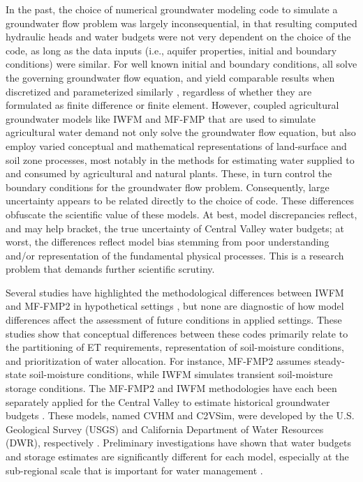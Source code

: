 In the past, the choice of numerical groundwater modeling code to simulate a groundwater flow problem was largely inconsequential, in that resulting computed hydraulic heads and water budgets were not very dependent on the choice of the code, as long as the data inputs (i.e., aquifer properties, initial and boundary conditions) were similar. For well known initial and boundary conditions, all solve the governing groundwater flow equation, and yield comparable results when discretized and parameterized similarly \citep{wang1977finite,anderson2015applied}, regardless of whether they are formulated as finite difference or finite element. However, coupled agricultural groundwater models like IWFM and MF-FMP that are used to simulate agricultural water demand not only solve the groundwater flow equation, but also employ varied conceptual and mathematical representations of land-surface and soil zone processes, most notably in the methods for estimating water supplied to and consumed by agricultural and natural plants. These, in turn control the boundary conditions for the groundwater flow problem. Consequently, large uncertainty appears to be related directly to the choice of code. These differences obfuscate the scientific value of these models. At best, model discrepancies reflect, and may help bracket, the true uncertainty of Central Valley water budgets; at worst, the differences reflect model bias stemming from poor understanding and/or representation of the fundamental physical processes. This is a research problem that demands further scientific scrutiny.

Several studies have highlighted the methodological differences between IWFM and MF-FMP2 in hypothetical settings \citep{harter2013peer,dogrul2011integrated,schmid2011comparison}, but none are diagnostic of how model differences affect the assessment of future conditions in applied settings. These studies show that conceptual differences between these codes primarily relate to the partitioning of ET requirements, representation of soil-moisture conditions, and prioritization of water allocation. For instance, MF-FMP2 assumes steady-state soil-moisture conditions, while IWFM simulates transient soil-moisture storage conditions. The MF-FMP2 and IWFM methodologies have each been separately applied for the Central Valley to estimate historical groundwater budgets \citep{brush2013development,faunt2009groundwater}. These models, named CVHM and C2VSim, were developed by the U.S. Geological Survey (USGS) and California Department of Water Resources (DWR), respectively \citep{faunt2009groundwater,brush2013development}. Preliminary investigations have shown that water budgets and storage estimates are significantly different for each model, especially at the sub-regional scale that is important for water management \citep{chou2012groundwater, maples2015estimation}. 

